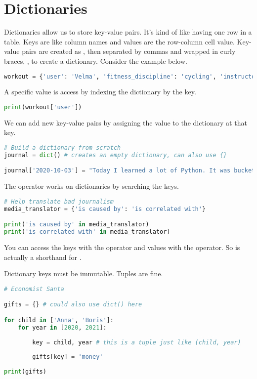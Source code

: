 

\section{Dictionaries}
\smallskip

Dictionaries allow us to store key-value pairs. It's kind of like having one row in a table. Keys are like column names and values are the row-column cell value. Key-value pairs are created as , then separated by commas and wrapped in curly braces, \code{\{\}}, to create a dictionary. Consider the example below.

\begin{lstlisting}[language = Python]
workout = {'user': 'Velma', 'fitness_discipline': 'cycling', 'instructor': 'Matt Wilpers'}
\end{lstlisting}

A specific value is access by indexing the dictionary by the key. 

\begin{lstlisting}[language = Python]
print(workout['user'])
\end{lstlisting}

\smallskip
We can add new key-value pairs by assigning the value to the dictionary at that key. 

\begin{lstlisting}[language = Python]
# Build a dictionary from scratch
journal = dict() # creates an empty dictionary, can also use {}

journal['2020-10-03'] = "Today I learned a lot of Python. It was buckets of fun."
\end{lstlisting}

\smallskip
\noindent The  operator works on dictionaries by searching the keys. 

\begin{lstlisting}[language = Python]
# Help translate bad journalism
media_translator = {'is caused by': 'is correlated with'}

print('is caused by' in media_translator)
print('is correlated with' in media_translator)
\end{lstlisting}


You can access the keys with the  operator and values with the  operator. So  is actually a shorthand for .

\smallskip

\noindent Dictionary keys must be immutable. Tuples are fine. 

\begin{lstlisting}[language = Python]
# Economist Santa

gifts = {} # could also use dict() here 

for child in ['Anna', 'Boris']:
    for year in [2020, 2021]:
        
        key = child, year # this is a tuple just like (child, year)
        
        gifts[key] = 'money'
        
print(gifts)
\end{lstlisting}

